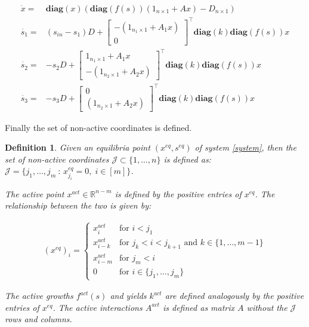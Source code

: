 \documentclass[3p,times]{article}
\newcommand{\R}{\mathbb{R}}
\newcommand{\diag}{\textbf{diag}}
\newtheorem{defn}{Definition}
\begin{document}
\begin{align}
\label{Eq1}	\dot{x} = & \diag(x)(\diag(f(s))(1_{n\times 1} + Ax) - D_{n\times 1}) \\
\label{Eq2}	\dot{s_1} = & (s_{in}-s_1)D + \begin{bmatrix}
-(1_{n_1\times 1} +A_1x) \\0
\end{bmatrix}^\top \diag(k) \diag(f(s))x \\
\label{Eq3}	\dot{s_2} = & -s_2D+
\begin{bmatrix}
1_{n_1\times 1} +A_1x \\ -(1_{n_2\times 1} +A_2x)
\end{bmatrix}^\top \diag(k) \diag(f(s))x \\	
\label{Eq4}	\dot{s_3} = & -s_3D+\begin{bmatrix}
0	\\(1_{n_2\times 1} +A_2x) 
\end{bmatrix}^\top \diag(k) \diag(f(s))x 
\end{align} 

Finally the set of non-active coordinates is defined.

\begin{defn}
	Given an equilibria point $(x^{eq},s^{eq})$ of system \eqref{system}, then the set of non-active coordinates $\mathcal{J}\subset \{1,\dots,n\}$ is defined as:
	$\mathcal{J} = \{j_1, \dots, j_m\ : \, x^{eq}_{j_i} = 0 , \;i \in [m] \} $.
	
	The active point $x^{act}\in \R^{n-m}$ is defined by the positive entries of $x^{eq}$. The relationship between the two is given by:
	
	\begin{align}\label{EquilibriaFormula} (x^{eq})_i = \begin{cases}
	x^{act}_i & \text{for } i < j_1\\
	x^{act}_{i-k} & \text{for } j_{k}< i <j_{k+1}  \text{ and } k \in \{1,\dots,m-1\}\\
	x^{act}_{i-m} & \text{for } j_{m}< i \\
	0 & \text{for } i \in \{j_1, \dots, j_m\}
	\end{cases} \end{align}	
	
	The active growths $f^{act}(s)$ and yields $k^{act}$ are defined analogously by the positive entries of $x^{eq}$. The active interactions $A^{act}$ is defined as matrix $A$ without the $\mathcal{J}$ rows and columns.
\end{defn}
\end{document}
